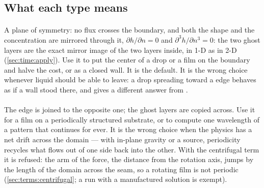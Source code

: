 \subsection{What each type means}

\paragraph{} A plane of symmetry: no flux crosses the
boundary, and both the shape and the concentration are mirrored through it,
$\partial h/\partial n = 0$ and $\partial^3 h/\partial n^3 = 0$: the two ghost
layers are the exact mirror image of the two layers inside, in 1-D as in 2-D
(\cref{sec:time:apply}). Use it to put
the center of a drop or a film on the boundary and halve the cost, or as a
closed wall. It is the default. It is the wrong choice whenever liquid should
be able to leave: a drop spreading toward a  edge behaves as
if a wall stood there, and gives a different answer from .

\paragraph{} The edge is joined to the opposite one; the ghost
layers are copied across. Use it for a film on a periodically structured
substrate, or to compute one wavelength of a pattern that continues for ever.
It is the wrong choice when the physics has a net drift across the domain ---
with in-plane gravity or a source, periodicity recycles what flows out of one
side back into the other. With the centrifugal term it is refused: the arm of
the force, the distance from the rotation axis, jumps by the length of the
domain across the seam, so a rotating film is not periodic
(\cref{sec:terms:centrifugal}; a run with a manufactured solution is
exempt).

